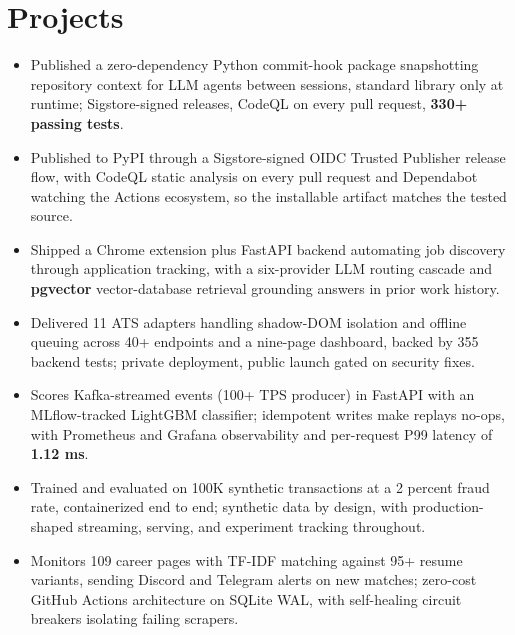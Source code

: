 \documentclass[letterpaper,10pt]{article}
\begin{document}
\section{Projects}
\begin{itemize}
\item Published a zero-dependency Python commit-hook package snapshotting repository context for LLM agents between sessions, standard library only at runtime; Sigstore-signed releases, CodeQL on every pull request, \textbf{330+ passing tests}.
\item Published to PyPI through a Sigstore-signed OIDC Trusted Publisher release flow, with CodeQL static analysis on every pull request and Dependabot watching the Actions ecosystem, so the installable artifact matches the tested source.
\end{itemize}
\begin{itemize}
\item Shipped a Chrome extension plus FastAPI backend automating job discovery through application tracking, with a six-provider LLM routing cascade and \textbf{pgvector} vector-database retrieval grounding answers in prior work history.
\item Delivered 11 ATS adapters handling shadow-DOM isolation and offline queuing across 40+ endpoints and a nine-page dashboard, backed by 355 backend tests; private deployment, public launch gated on security fixes.
\end{itemize}
\begin{itemize}
\item Scores Kafka-streamed events (100+ TPS producer) in FastAPI with an MLflow-tracked LightGBM classifier; idempotent writes make replays no-ops, with Prometheus and Grafana observability and per-request P99 latency of \textbf{1.12 ms}.
\item Trained and evaluated on 100K synthetic transactions at a 2 percent fraud rate, containerized end to end; synthetic data by design, with production-shaped streaming, serving, and experiment tracking throughout.
\end{itemize}
\begin{itemize}
\item Monitors 109 career pages with TF-IDF matching against 95+ resume variants, sending Discord and Telegram alerts on new matches; zero-cost GitHub Actions architecture on SQLite WAL, with self-healing circuit breakers isolating failing scrapers.
\end{itemize}
\end{document}
